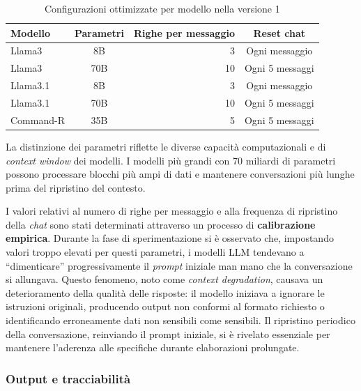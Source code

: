 \documentclass[12pt,twoside]{report}
\begin{document}
\begin{table}[h!]
    \centering
    \begin{tabular}{|l|c|r|c|}
        \hline
        \textbf{Modello} & \textbf{Parametri} & \textbf{Righe per messaggio} & \textbf{Reset chat} \\ \hline
        Llama3           & 8B                 & 3                            & Ogni messaggio      \\ \hline
        Llama3           & 70B                & 10                           & Ogni 5 messaggi     \\ \hline
        Llama3.1         & 8B                 & 3                            & Ogni messaggio      \\ \hline
        Llama3.1         & 70B                & 10                           & Ogni 5 messaggi     \\ \hline
        Command-R        & 35B                & 5                            & Ogni 5 messaggi     \\ \hline
    \end{tabular}
    \caption{Configurazioni ottimizzate per modello nella versione 1}
    \label{tab:modelli_llm_ver1}
\end{table}

La distinzione dei parametri riflette le diverse capacità computazionali e di \textit{context window} dei modelli. I modelli più grandi con 70 miliardi di parametri possono processare blocchi più ampi di dati e mantenere conversazioni più lunghe prima del ripristino del contesto.

I valori relativi al numero di righe per messaggio e alla frequenza di ripristino della \textit{chat} sono stati determinati attraverso un processo di \textbf{calibrazione empirica}. Durante la fase di sperimentazione si è osservato che, impostando valori troppo elevati per questi parametri, i modelli LLM tendevano a ``dimenticare'' progressivamente il \textit{prompt} iniziale man mano che la conversazione si allungava. Questo fenomeno, noto come \textit{context degradation}, causava un deterioramento della qualità delle risposte: il modello iniziava a ignorare le istruzioni originali, producendo output non conformi al formato richiesto o identificando erroneamente dati non sensibili come sensibili. Il ripristino periodico della conversazione, reinviando il prompt iniziale, si è rivelato essenziale per mantenere l'aderenza alle specifiche durante elaborazioni prolungate.

\subsubsection{Output e tracciabilità}
\label{subsubsec:ver1_output}
\end{document}
